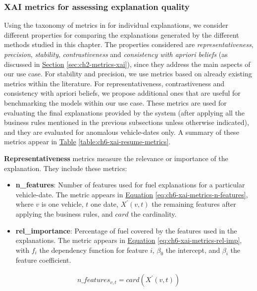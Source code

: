 \subsubsection{XAI metrics for assessing explanation quality}\label{subsec:ch6-xai-metrics}
\leavevmode\newline
Using the taxonomy of metrics in \parencite{carvalho2019machine} for individual explanations, we consider different properties for comparing the explanations generated by the different methods studied in this chapter. The properties considered are \textit{representativeness}, \textit{precision}, \textit{stability}, \textit{contrastiveness} and \textit{consistency with apriori beliefs} (as discussed in \hyperref[sec:ch2-metrics-xai]{Section} \ref{sec:ch2-metrics-xai}), since they address the main aspects of our use case. For stability and precision, we use metrics based on already existing metrics within the literature. For representativeness, contrastiveness and consistency with apriori beliefs, we propose additional ones that are useful for benchmarking the models within our use case. 
These metrics are used for evaluating the final explanations provided by the system (after applying all the business rules mentioned in the previous subsections unless otherwise indicated), and they are evaluated for anomalous vehicle-dates only. A summary of these metrics appear in \hyperref[table:ch6-xai-resume-metrics]{Table} \ref{table:ch6-xai-resume-metrics}.

\textbf{Representativeness} metrics measure the relevance or importance of the explanation. They include these metrics:
\begin{itemize}
    \item \textbf{n\_features}: Number of features used for fuel explanations for a particular vehicle-date. The metric appears in \hyperref[eq:ch6-xai-metrics-n-features]{Equation} \ref{eq:ch6-xai-metrics-n-features}, where $v$ is one vehicle, $t$ one date, $X^{'}(v,t)$ the remaining features after applying the business rules, and $card$ the cardinality.
    \item \textbf{rel\_importance}: Percentage of fuel covered by the features used in the explanations. The metric appears in \hyperref[eq:ch6-xai-metrics-rel-imp]{Equation} \ref{eq:ch6-xai-metrics-rel-imp}, with $f_{i}$ the dependency function for feature $i$, $\beta_0$ the intercept, and  $\beta_i$ the feature coefficient.
\end{itemize}

\begin{equation}\label{eq:ch6-xai-metrics-n-features}
\begin{aligned}
n\_features_{v,t} = card(X^{'}(v,t))
\end{aligned}
\end{equation}

